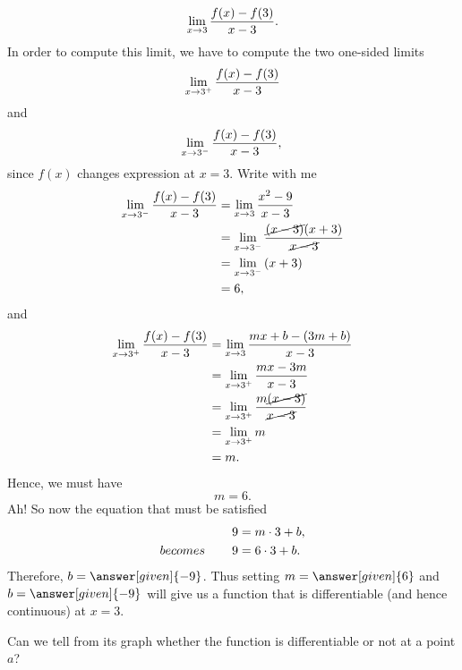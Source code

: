 \documentclass{ximera}
\begin{document}
\begin{example}
\begin{explanation}
 \[
 \lim_{x\to 3}\frac{f(x)-f(3)}{x-3}.\\
\]
In order to compute this limit, we have to compute the two one-sided limits
 \[
 \lim_{x\to 3^{+}}\frac{f(x)-f(3)}{x-3}\\
\]
and
\[
 \lim_{x\to 3^{-}}\frac{f(x)-f(3)}{x-3},\\
\]
since  $f(x)$ changes expression at $x=3$.
Write with me
     \begin{align*}
        \lim_{x\to 3^{-}}\frac{f(x)-f(3)}{x-3}&= \lim_{x\to 3}\frac{x^2 -9}{x-3}\\
      &= \lim_{x\to 3^{-}}\frac{\cancel{(x-3)}(x+3)}{\cancel{x-3}}\\
      &= \lim_{x\to 3^{-}}\left(x+3\right)\\
      &=6,
    \end{align*}
    and
   \begin{align*}
        \lim_{x\to 3^{+}}\frac{f(x)-f(3)}{x-3}&= \lim_{x\to 3}\frac{mx+b -(3m+b)}{x-3}\\
          &= \lim_{x\to 3^{+}}\frac{mx-3m}{x-3}\\
      &= \lim_{x\to 3^{+}}\frac{m\cancel{(x-3)}}{\cancel{x-3}}\\
      &= \lim_{x\to 3^{+}}m\\
      &=m.
    \end{align*}
    Hence, we must have
   \[
      m=6.
  \]
    Ah! So now the equation that must be satisfied
    \begin{align*}
      9 &= m\cdot 3 + b,\\
    becomes\hspace{0.3in}  9 &= 6\cdot 3 + b.\\
    \end{align*}
   Therefore, $b=\answer[given]{-9}$. Thus setting $m=\answer[given]{6}$ and
    $b=\answer[given]{-9}$ will give us a function that is differentiable (and hence
    continuous) at $x=3$.
   
  \end{explanation}
\end{example}
Can we tell from its graph whether the function is differentiable or not at a point $a$?
\end{document}
